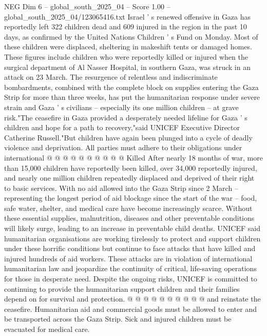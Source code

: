 \begin{textsample}{NEG Dim 6 – global\_south\_2025\_04 – Score 1.00 – global\_south\_2025\_04/123065416.txt}  \label{ex:f6_neg_210}
Israel ' s renewed offensive in Gaza has reportedly left 322 children dead and 609 injured in the region in the past 10 days, as confirmed by the United Nations Children ' s Fund on Monday.
Most of these children were displaced, sheltering in makeshift tents or damaged homes.
These figures include children who were reportedly killed or injured when the surgical department of Al Nasser Hospital, in southern Gaza, was struck in an attack on 23 March.
The resurgence of relentless and indiscriminate bombardments, combined with the complete block on supplies entering the Gaza Strip for more than three weeks, has put the humanitarian response under severe strain and Gaza ' s civilians -- especially its one million children -- at grave risk."The ceasefire in Gaza provided a desperately needed lifeline for Gaza ' s children and hope for a path to recovery,"said UNICEF Executive Director Catherine Russell."But children have again been plunged into a cycle of deadly violence and deprivation.
All parties must adhere to their obligations under international @ @ @ @ @ @ @ @ @ @ Killed After nearly 18 months of war, more than 15,000 children have reportedly been killed, over 34,000 reportedly injured, and nearly one million children repeatedly displaced and deprived of their right to basic services.
With no aid allowed into the Gaza Strip since 2 March -- representing the longest period of aid blockage since the start of the war -- food, safe water, shelter, and medical care have become increasingly scarce.
Without these essential supplies, malnutrition, diseases and other preventable conditions will likely surge, leading to an increase in preventable child deaths.
UNICEF said humanitarian organisations are working tirelessly to protect and support children under these horrific conditions but continue to face attacks that have killed and injured hundreds of aid workers.
These attacks are in violation of international humanitarian law and jeopardize the continuity of critical, life-saving operations for those in desperate need.
Despite the ongoing risks, UNICEF is committed to continuing to provide the humanitarian support children and their families depend on for survival and protection. @ @ @ @ @ @ @ @ @ @ and reinstate the ceasefire.
Humanitarian aid and commercial goods must be allowed to enter and be transported across the Gaza Strip.
Sick and injured children must be evacuated for medical care.

\end{textsample}
